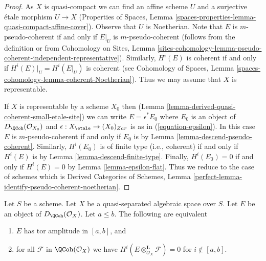 \begin{proof}
As $X$ is quasi-compact we can find an affine scheme $U$ and a surjective
\'etale morphism $U \to X$ (Properties of Spaces, Lemma
\ref{spaces-properties-lemma-quasi-compact-affine-cover}).
Observe that $U$ is Noetherian.
Note that $E$ is $m$-pseudo-coherent if and only if $E|_U$ is
$m$-pseudo-coherent (follows from the definition or from
Cohomology on Sites, Lemma
\ref{sites-cohomology-lemma-pseudo-coherent-independent-representative}).
Similarly, $H^i(E)$ is coherent if and only if $H^i(E)|_U = H^i(E|_U)$
is coherent (see Cohomology of Spaces, Lemma
\ref{spaces-cohomology-lemma-coherent-Noetherian}).
Thus we may assume that $X$ is representable.

\medskip\noindent
If $X$ is representable by a scheme $X_0$ then
(Lemma \ref{lemma-derived-quasi-coherent-small-etale-site})
we can write $E = \epsilon^*E_0$ where $E_0$ is an object of
$D_\QCoh(\mathcal{O}_{X_0})$ and
$\epsilon : X_\etale \to (X_0)_{Zar}$ is as in
(\ref{equation-epsilon}).
In this case $E$ is $m$-pseudo-coherent
if and only if $E_0$ is by Lemma \ref{lemma-descend-pseudo-coherent}.
Similarly, $H^i(E_0)$ is of finite type (i.e., coherent) if and only if
$H^i(E)$ is by Lemma \ref{lemma-descend-finite-type}.
Finally, $H^i(E_0) = 0$ if and only if $H^i(E) = 0$ by
Lemma \ref{lemma-epsilon-flat}.
Thus we reduce to the case of schemes which is
Derived Categories of Schemes, Lemma
\ref{perfect-lemma-identify-pseudo-coherent-noetherian}.
\end{proof}

\begin{lemma}
\label{lemma-tor-qc-qs}
Let $S$ be a scheme. Let $X$ be a quasi-separated algebraic space over $S$.
Let $E$ be an object of $D_\QCoh(\mathcal{O}_X)$. Let $a \leq b$.
The following are equivalent
\begin{enumerate}
\item $E$ has tor amplitude in $[a, b]$, and
\item for all $\mathcal{F}$ in $\QCoh(\mathcal{O}_X)$
we have $H^i(E \otimes_{\mathcal{O}_X}^\mathbf{L} \mathcal{F}) = 0$
for $i \not \in [a, b]$.
\end{enumerate}
\end{lemma}


